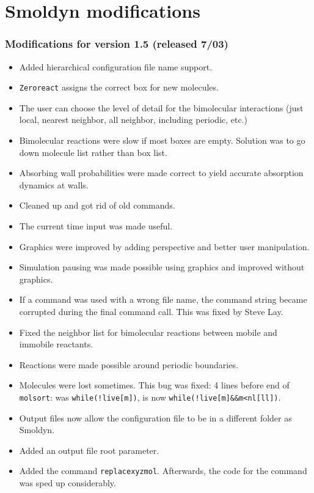 \documentclass {scrbook}
\newcommand {\ttt} {\texttt}
\begin{document}
\chapter{Smoldyn modifications}

\renewcommand{\labelitemi}{$\cdot$}

\subsection{Modifications for version 1.5 (released 7/03)}
\begin{itemize}
\item Added hierarchical configuration file name support.
\item \ttt{Zeroreact} assigns the correct box for new molecules.
\item The user can choose the level of detail for the bimolecular interactions (just local, nearest neighbor, all neighbor, including periodic, etc.)
\item Bimolecular reactions were slow if most boxes are empty. Solution was to go down molecule list rather than box list.
\item Absorbing wall probabilities were made correct to yield accurate absorption dynamics at walls.
\item Cleaned up and got rid of old commands.
\item The current time input was made useful.
\item Graphics were improved by adding perspective and better user manipulation.
\item Simulation pausing was made possible using graphics and improved without graphics.
\item If a command was used with a wrong file name, the command string became corrupted during the final command call. This was fixed by Steve Lay.
\item Fixed the neighbor list for bimolecular reactions between mobile and immobile reactants.
\item Reactions were made possible around periodic boundaries.
\item Molecules were lost sometimes. This bug was fixed: 4 lines before end of \ttt{molsort}: was \lstinline{while(!live[m])}, is now \lstinline{while(!live[m]&&m<nl[ll])}.
\item Output files now allow the configuration file to be in a different folder as Smoldyn.
\item Added an output file root parameter.
\item Added the command \ttt{replacexyzmol}. Afterwards, the code for the command was sped up considerably.

\end{itemize}
\end{document}
